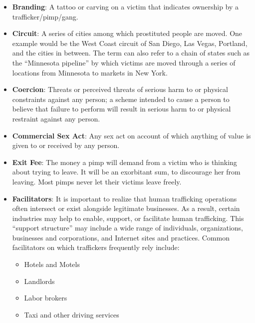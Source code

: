 \documentclass[10pt, letterpaper]{article}
\begin{document}
\begin{itemize}
\item 
\textbf{Branding}: A tattoo or carving on a victim that indicates
ownership by a trafficker/pimp/gang.
\item
\textbf{Circuit}: A series of cities among which prostituted people are
moved. One example would be the West Coast circuit of San Diego, Las
Vegas, Portland, and the cities in between. The term can also refer to a
chain of states such as the ``Minnesota pipeline'' by which victims are
moved through a series of locations from Minnesota to markets in New
York.
\item
\textbf{Coercion}: Threats or perceived threats of serious harm to or
physical constraints against any person; a scheme intended to cause a
person to believe that failure to perform will result in serious harm to
or physical restraint against any person.
\item
\textbf{Commercial Sex Act}: Any sex act on account of which anything of
value is given to or received by any person.
\item
\textbf{Exit Fee}: The money a pimp will demand from a victim who is
thinking about trying to leave. It will be an exorbitant sum, to
discourage her from leaving. Most pimps never let their victims leave
freely.
\item
\textbf{Facilitators}: It is important to realize that human trafficking
operations often intersect or exist alongside legitimate businesses. As
a result, certain industries may help to enable, support, or facilitate
human trafficking. This ``support structure'' may include a wide range
of individuals, organizations, businesses and corporations, and Internet
sites and practices. Common facilitators on which traffickers frequently
rely include:

\begin{itemize}
\item
  
  Hotels and Motels
  
\item
  
  Landlords
  
\item
  
  Labor brokers
  
\item
  
  Taxi and other driving services
  

\end{itemize}
\end{itemize}
\end{document}
